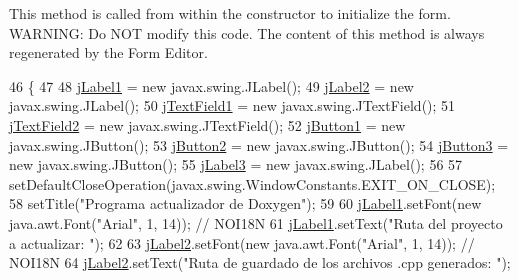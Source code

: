This method is called from within the constructor to initialize the form. W\+A\+R\+N\+I\+NG\+: Do N\+OT modify this code. The content of this method is always regenerated by the Form Editor. 
\begin{DoxyCode}
46                                   \{
47 
48         \mbox{\hyperlink{classactualizadordoxy_1_1ventana_principal_aa119cc780acbfdd1f1dc1fa1899136f4}{jLabel1}} = \textcolor{keyword}{new} javax.swing.JLabel();
49         \mbox{\hyperlink{classactualizadordoxy_1_1ventana_principal_af6f45a2a5f32cdee4845fcd9e66f16c8}{jLabel2}} = \textcolor{keyword}{new} javax.swing.JLabel();
50         \mbox{\hyperlink{classactualizadordoxy_1_1ventana_principal_a0e2df794c32f58c41675cd579e38b5d0}{jTextField1}} = \textcolor{keyword}{new} javax.swing.JTextField();
51         \mbox{\hyperlink{classactualizadordoxy_1_1ventana_principal_a8e245eb8ef04c878fffa2f029094c142}{jTextField2}} = \textcolor{keyword}{new} javax.swing.JTextField();
52         \mbox{\hyperlink{classactualizadordoxy_1_1ventana_principal_a9e234f123e4d11dcd43f19051065a6bd}{jButton1}} = \textcolor{keyword}{new} javax.swing.JButton();
53         \mbox{\hyperlink{classactualizadordoxy_1_1ventana_principal_a2cf13d88ffb8e10bbc41bf5d690bd6fe}{jButton2}} = \textcolor{keyword}{new} javax.swing.JButton();
54         \mbox{\hyperlink{classactualizadordoxy_1_1ventana_principal_a228eef1536949c06fd4cfef1fe9b97b8}{jButton3}} = \textcolor{keyword}{new} javax.swing.JButton();
55         \mbox{\hyperlink{classactualizadordoxy_1_1ventana_principal_a7581b585f39de6258b08299571546229}{jLabel3}} = \textcolor{keyword}{new} javax.swing.JLabel();
56 
57         setDefaultCloseOperation(javax.swing.WindowConstants.EXIT\_ON\_CLOSE);
58         setTitle(\textcolor{stringliteral}{"Programa actualizador de Doxygen"});
59 
60         \mbox{\hyperlink{classactualizadordoxy_1_1ventana_principal_aa119cc780acbfdd1f1dc1fa1899136f4}{jLabel1}}.setFont(\textcolor{keyword}{new} java.awt.Font(\textcolor{stringliteral}{"Arial"}, 1, 14)); \textcolor{comment}{// NOI18N}
61         \mbox{\hyperlink{classactualizadordoxy_1_1ventana_principal_aa119cc780acbfdd1f1dc1fa1899136f4}{jLabel1}}.setText(\textcolor{stringliteral}{"Ruta del proyecto a actualizar: "});
62 
63         \mbox{\hyperlink{classactualizadordoxy_1_1ventana_principal_af6f45a2a5f32cdee4845fcd9e66f16c8}{jLabel2}}.setFont(\textcolor{keyword}{new} java.awt.Font(\textcolor{stringliteral}{"Arial"}, 1, 14)); \textcolor{comment}{// NOI18N}
64         \mbox{\hyperlink{classactualizadordoxy_1_1ventana_principal_af6f45a2a5f32cdee4845fcd9e66f16c8}{jLabel2}}.setText(\textcolor{stringliteral}{"Ruta de guardado de los archivos .cpp generados: "});

\end{DoxyCode}
